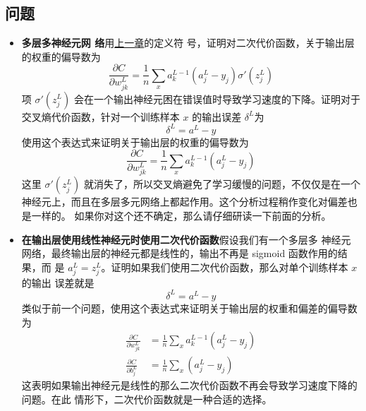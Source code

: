 \subsection*{问题}

\begin{itemize}
\item \textbf{多层多神经元网
    络}\quad 用\hyperref[ch:HowTheBackpropagationAlgorithmWorks]{上一章}的定义符
  号，证明对二次代价函数，关于输出层的权重的偏导数为
  \begin{equation}
    \frac{\partial C}{\partial w^L_{jk}} = \frac{1}{n}
    \sum_x a^{L-1}_k  (a^L_j-y_j) \sigma'(z^L_j)
    \label{eq:65}\tag{65}
  \end{equation}
  项 $\sigma'(z^L_j)$ 会在一个输出神经元困在错误值时导致学习速度的下降。证明对于
  交叉熵代价函数，针对一个训练样本 $x$ 的输出误差 $\delta^L$为
  \begin{equation} 
    \delta^L = a^L-y
    \label{eq:66}\tag{66}
  \end{equation}
  使用这个表达式来证明关于输出层的权重的偏导数为
  \begin{equation} 
    \frac{\partial C}{\partial w^L_{jk}} = \frac{1}{n} \sum_x 
    a^{L-1}_k  (a^L_j-y_j)
    \label{eq:67}\tag{67}
  \end{equation}
  这里 $\sigma'(z^L_j)$ 就消失了，所以交叉熵避免了学习缓慢的问题，不仅仅是在一个
  神经元上，而且在多层多元网络上都起作用。这个分析过程稍作变化对偏差也是一样的。
  如果你对这个还不确定，那么请仔细研读一下前面的分析。
\item \textbf{在输出层使用线性神经元时使用二次代价函数}\quad 假设我们有一个多层多
  神经元网络，最终输出层的神经元都是线性的，输出不再是 sigmoid 函数作用的结果，而
  是 $a^L_j = z^L_j$。证明如果我们使用二次代价函数，那么对单个训练样本 $x$ 的输出
  误差就是
  \begin{equation}
    \delta^L = a^L-y
    \label{eq:68}\tag{68}
  \end{equation}
  类似于前一个问题，使用这个表达式来证明关于输出层的权重和偏差的偏导数为
  \begin{align}
    \frac{\partial C}{\partial w^L_{jk}} &= \frac{1}{n} \sum_x 
                                           a^{L-1}_k  (a^L_j-y_j) \label{eq:69}\tag{69}\\
    \frac{\partial C}{\partial b^L_{j}} &= \frac{1}{n} \sum_x 
                                          (a^L_j-y_j) \label{eq:70}\tag{70}
  \end{align}
  这表明如果输出神经元是线性的那么二次代价函数不再会导致学习速度下降的问题。在此
  情形下，二次代价函数就是一种合适的选择。
\end{itemize}

